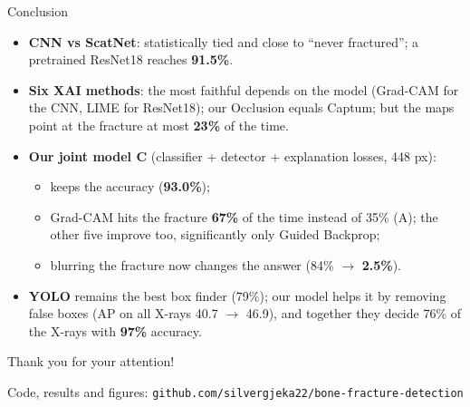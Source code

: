 \documentclass[aspectratio=169,10pt]{beamer}
\begin{document}
\begin{frame}{Conclusion}
  \begin{itemize}
    \item \textbf{CNN vs ScatNet}: statistically tied and close to ``never fractured''; a pretrained ResNet18 reaches
          \textbf{91.5\%}.
    \item \textbf{Six XAI methods}: the most faithful depends on the model (Grad-CAM for the CNN, LIME for ResNet18);
          our Occlusion equals Captum; but the maps point at the fracture at most \textbf{23\%} of the time.
    \item \textbf{Our joint model C} (classifier + detector + explanation losses, 448 px):
      \begin{itemize}
        \item keeps the accuracy (\textbf{93.0\%});
        \item Grad-CAM hits the fracture \textbf{67\%} of the time instead of 35\% (A); the other five improve too,
              significantly only Guided Backprop;
        \item blurring the fracture now changes the answer (84\% $\to$ \textbf{2.5\%}).
      \end{itemize}
    \item \textbf{YOLO} remains the best box finder (79\%); our model helps it by removing false boxes (AP on all X-rays
          40.7 $\to$ 46.9), and together they decide 76\% of the X-rays with \textbf{97\%} accuracy.
  \end{itemize}
\end{frame}

\begin{frame}[plain]
  \vfill\centering
  {\color{black}Thank you for your attention!\par}
  \vspace{1em}
  {\small Code, results and figures: \texttt{github.com/silvergjeka22/bone-fracture-detection}}
  \vfill
\end{frame}
\end{document}
